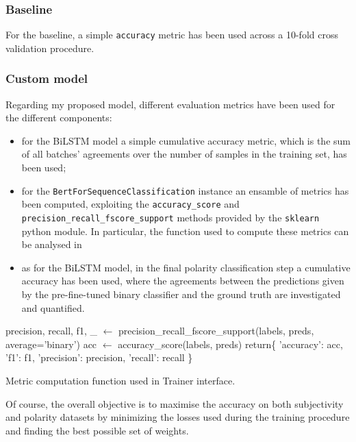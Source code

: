 \subsubsection{Baseline}
For the baseline, a simple \texttt{accuracy} metric has been used across a 10-fold cross validation procedure.
\vspace{-.5em}
\subsubsection{Custom model}
Regarding my proposed model, different evaluation metrics have been used for the different components:
\begin{itemize}
    \item for the BiLSTM model a simple cumulative accuracy metric, which is the sum of all batches' agreements over the number of samples in the training set, has been used;
    \item for the \texttt{BertForSequenceClassification} instance an ensamble of metrics has been computed, exploiting the 
    \texttt{accuracy\_score} and \texttt{precision\_recall\_fscore\_support} methods provided by the \texttt{sklearn} python module. 
    In particular, the function used to compute these metrics can be analysed in \textbf{}
    \item as for the BiLSTM model, in the final polarity classification step a cumulative accuracy has been used, where the agreements
    between the predictions given by the pre-fine-tuned binary classifier and the ground truth are investigated and quantified.
\end{itemize}

\vspace{-1.0em}
\begin{algorithm}[!h]
    \SetAlgoLined
    \DontPrintSemicolon
    \CommentSty{\color{blue}}
    precision, recall, f1, \_  $\gets$ precision\_recall\_fscore\_support(labels, preds, average='binary')\;
    acc $\gets$ accuracy\_score(labels, preds)\;
    return\{
            'accuracy': acc,\;
            \hspace{10mm}'f1': f1,\;
            \hspace{10mm}'precision': precision,\;
            \hspace{10mm}'recall': recall
        \}
\caption{Metric computation function used in Trainer interface.}
\label{alg:binaryclf}
\end{algorithm}
\vspace{-0.25cm}
Of course, the overall objective is to maximise the accuracy on both subjectivity and polarity datasets by minimizing the losses used during the training procedure and 
finding the best possible set of weights. 

